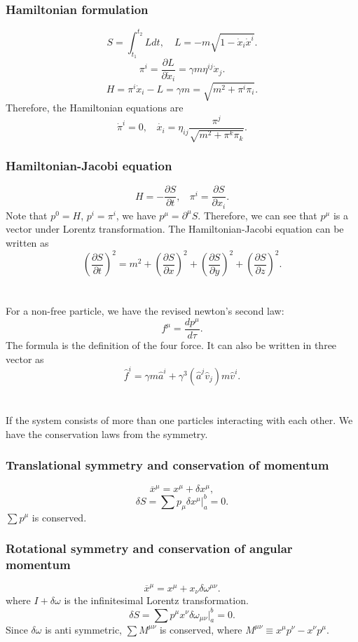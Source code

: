 \subsubsection{Hamiltonian formulation}
\[S = \int_{t_1}^{t_2} L dt , \quad L = - m \sqrt{1-\dot{x}_i\dot{x}^i}.\]
\[\pi^i = \frac{\partial L}{\partial \dot{x}_i} = \gamma m \eta^{ij}\dot{x}_j.\]
\[H = \pi^i \dot{x}_i - L = \gamma m = \sqrt{m^2 + \pi^i \pi_i}.\]
Therefore, the Hamiltonian equations are
\[\dot{\pi}^i = 0, \ \ \ \ \dot{x_i} = \eta_{ij}\frac{\pi^j}{\sqrt{m^2 + \pi^k \pi_k}}.\]
\subsubsection{Hamiltonian-Jacobi equation}
\[H = -\frac{\partial S}{\partial t}, \ \ \ \ \pi^i = \frac{\partial S}{\partial x_i}.\]
Note that $p^0 = H$, $p^i = \pi^i$, we have $p^{\mu} = \partial^{\mu} S$. Therefore, we can see that $p^{\mu}$ is a vector under Lorentz transformation. The Hamiltonian-Jacobi equation can be written as
\[(\frac{\partial S}{\partial t})^2 = m^2 + (\frac{\partial S}{\partial x})^2 + (\frac{\partial S}{\partial y})^2 + (\frac{\partial S}{\partial z})^2.\]
\\ \\
For a non-free particle, we have the revised newton's second law:
\[f^{\mu} = \frac{dp^{\mu}}{d\tau}.\]
The formula is the definition of the four force. It can also be written in three vector as
\[\hat{f}^i = \gamma m \hat{a}^i + \gamma^3 (\hat{a}^j \hat{v}_j) m \hat{v}^i.\]
\\ \\
If the system consists of more than one particles interacting with each other. We have the conservation laws from the symmetry.
\subsubsection{Translational symmetry and conservation of momentum}
\[\overline{x}^{\mu} = x^{\mu} + \delta x^{\mu},\]
\[\delta S = \sum p_{\mu} \delta x^{\mu}|_a^b = 0 .\]
$\sum p^{\mu}$ is conserved.
\subsubsection{Rotational symmetry and conservation of angular momentum}
\[\overline{x}^{\mu} = x^{\mu} + x_{\nu}\delta \omega^{\mu \nu}.\]
where $I+\delta \omega$ is the infinitesimal Lorentz transformation.
\[\delta S = \sum p^{\mu} x^{\nu} \delta \omega_{\mu \nu}|_a^b = 0 .\]
Since $\delta \omega$ is anti symmetric, $\sum M^{\mu \nu} $ is conserved, where $M^{\mu \nu} \equiv x^{\mu}p^{\nu} - x^{\nu}p^{\mu}$.

